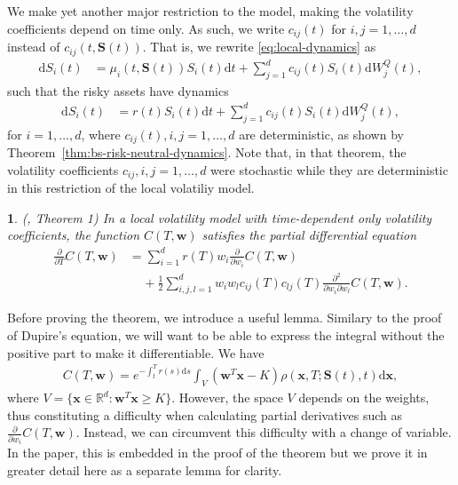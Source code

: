 \documentclass[english]{article}
\numberwithin{equation}{section}
\numberwithin{figure}{section}
\theoremstyle{bolddescit}
\newtheorem{theorem}{\protect\theoremname}[section]
\theoremstyle{definition}
\theoremstyle{definition}
\theoremstyle{plain}
\theoremstyle{plain}
\theoremstyle{bolddesc}
\theoremstyle{plain}
\theoremstyle{remark}
\providecommand{\theoremname}{Theorem}
\begin{document}
We make yet another major restriction to the model, making the volatility coefficients depend on time only. As such, we write $c_{ij}(t)$ for $i,j=1,\ldots,d$ instead of $c_{ij}(t,\mathbf{S}(t))$. That is, we rewrite \eqref{eq:local-dynamics} as
\begin{align*}
  \mathrm{d}S_i(t) &= \mu_i(t, \mathbf{S}(t)) S_i(t) \mathrm{d}t + \sum_{j=1}^{d} c_{ij}(t) S_i(t) \mathrm{d}W^Q_j(t),
\end{align*}
such that the risky assets have dynamics
\begin{align*}
  \mathrm{d}S_i(t) &= r(t) S_i(t) \mathrm{d}t + \sum_{j=1}^{d} c_{ij}(t) S_i(t) \mathrm{d}W^Q_j(t),
\end{align*}
for $i=1,\ldots,d$, where $c_{ij}(t), i,j=1,\ldots,d$ are deterministic, as shown by Theorem~\ref{thm:bs-risk-neutral-dynamics}. Note that, in that theorem, the volatility coefficients $c_{ij}, i,j=1,\ldots,d$ were stochastic while they are deterministic in this restriction of the local volatiliy model.

\begin{theorem}\label{thm:generalisation}
  (\cite{amster_towards_2009}, Theorem 1)
  In a local volatility model with time-dependent only volatility coefficients, the function $C(T,\mathbf{w})$ satisfies the partial differential equation
  \begin{align*}
      \frac{\partial}{\partial T} C(T,\mathbf{w})
      &= \sum_{i=1}^{d} r(T) w_i \frac{\partial}{\partial w_i} C(T,\mathbf{w})\\
      &\ \ \ \ \ + \frac{1}{2} \sum_{i,j,l=1}^{d} w_i w_l c_{ij}(T) c_{lj}(T) \frac{\partial^2}{\partial w_i \partial w_l} C(T,\mathbf{w}).
  \end{align*}
\end{theorem}

Before proving the theorem, we introduce a useful lemma. Similary to the proof of Dupire's equation, we will want to be able to express the integral without the positive part to make it differentiable. We have
\begin{align}\label{eq:generalisation-int-over-V}
  C(T,\mathbf{w}) = e^{-\int_t^T r(s) \mathrm{d}s} \int_V (\mathbf{w}^T\mathbf{x} - K) \rho(\mathbf{x},T;\mathbf{S}(t),t) \mathrm{d}\mathbf{x},
\end{align}
where $V = \{ \mathbf{x} \in \mathbb{R}^d : \mathbf{w}^T \mathbf{x} \ge K \}$. However, the space $V$ depends on the weights, thus constituting a difficulty when calculating partial derivatives such as $\frac{\partial}{\partial w_i}C(T,\mathbf{w})$. Instead, we can circumvent this difficulty with a change of variable. In the paper, this is embedded in the proof of the theorem but we prove it in greater detail here as a separate lemma for clarity.
\end{document}
